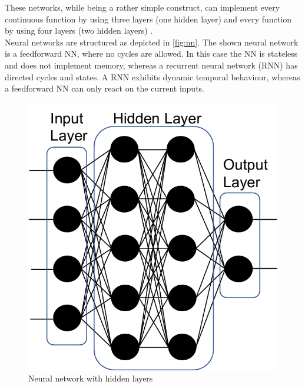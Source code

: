 These networks, while being a rather simple construct, can implement every continuous function by using three layers (one hidden layer) and every function by using four layers (two hidden layers) \cite{russel}. \\
Neural networks are structured as depicted in \autoref{fig:nn}. The shown neural network is a feedforward NN, where no cycles are allowed. In this case the NN is stateless and does not implement memory, whereas a recurrent neural network (RNN) has directed cycles and states. A RNN exhibits dynamic temporal behaviour, whereas a feedforward NN can only react on the current inputs.
\begin{figure}[h]
	\center
	\includegraphics[width=0.7\linewidth]{nn}
	\caption{Neural network with hidden layers}
	\label{fig:nn}
\end{figure}

